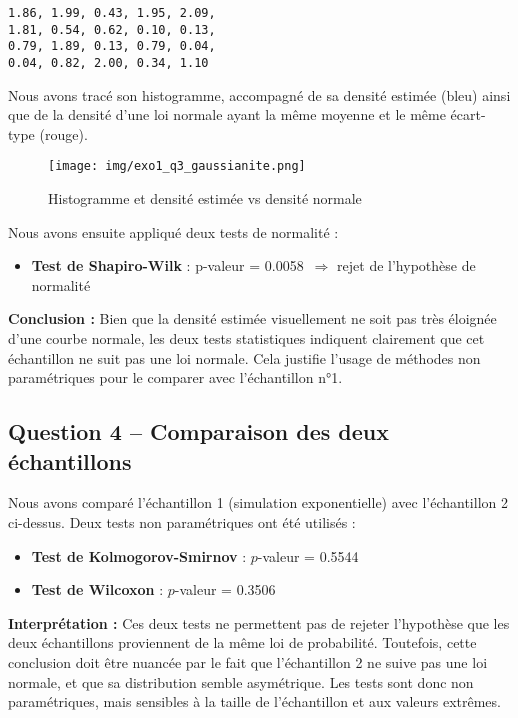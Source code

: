\documentclass[a4paper,11pt]{article}
\begin{document}
\begin{verbatim}
1.86, 1.99, 0.43, 1.95, 2.09,
1.81, 0.54, 0.62, 0.10, 0.13,
0.79, 1.89, 0.13, 0.79, 0.04,
0.04, 0.82, 2.00, 0.34, 1.10
\end{verbatim}

Nous avons tracé son histogramme, accompagné de sa densité estimée (bleu) ainsi que de la densité d’une loi normale ayant la même moyenne et le même écart-type (rouge).

\begin{figure}[H]
    \centering
    \texttt{[image: img/exo1\_q3\_gaussianite.png]}
    \caption{Histogramme et densité estimée vs densité normale}
\end{figure}

Nous avons ensuite appliqué deux tests de normalité :
\begin{itemize}
    \item \textbf{Test de Shapiro-Wilk} : p-valeur = 0.0058~$\Rightarrow$ rejet de l’hypothèse de normalité
    
\end{itemize}

\textbf{Conclusion :} Bien que la densité estimée visuellement ne soit pas très éloignée d’une courbe normale, les deux tests statistiques indiquent clairement que cet échantillon ne suit pas une loi normale. Cela justifie l’usage de méthodes non paramétriques pour le comparer avec l’échantillon n°1.

\subsection*{Question 4 – Comparaison des deux échantillons}
Nous avons comparé l’échantillon 1 (simulation exponentielle) avec l’échantillon 2 ci-dessus. Deux tests non paramétriques ont été utilisés :
\begin{itemize}
    \item \textbf{Test de Kolmogorov-Smirnov} : $p$-valeur = 0.5544
    \item \textbf{Test de Wilcoxon} : $p$-valeur = 0.3506
\end{itemize}

\textbf{Interprétation :} Ces deux tests ne permettent pas de rejeter l’hypothèse que les deux échantillons proviennent de la même loi de probabilité. Toutefois, cette conclusion doit être nuancée par le fait que l’échantillon 2 ne suive pas une loi normale, et que sa distribution semble asymétrique. Les tests sont donc non paramétriques, mais sensibles à la taille de l’échantillon et aux valeurs extrêmes.
\end{document}
